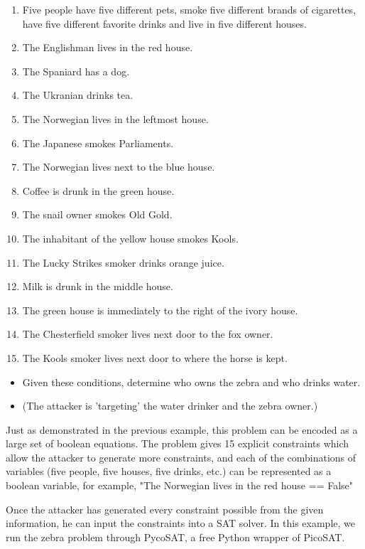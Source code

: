 \documentclass[jou,apacite]{apa6}
\begin{document}
\begin{enumerate}
\item Five people have five different pets, smoke five different
       brands of cigarettes, have five different favorite drinks and
       live in five different houses.
\item The Englishman lives in the red house.
\item The Spaniard has a dog.
\item The Ukranian drinks tea.
\item The Norwegian lives in the leftmost house.
\item The Japanese smokes Parliaments.
\item The Norwegian lives next to the blue house.
\item Coffee is drunk in the green house.
\item The snail owner smokes Old Gold.
\item The inhabitant of the yellow house smokes Kools.
\item The Lucky Strikes smoker drinks orange juice.
\item Milk is drunk in the middle house.
\item The green house is immediately to the right of the ivory house.
\item The Chesterfield smoker lives next door to the fox owner.
\item The Kools smoker lives next door to where the horse is kept.
\end{enumerate}


\begin{itemize}
\item Given these conditions, determine who owns the zebra and who drinks water.
\item (The attacker is 'targeting' the water drinker and the zebra owner.)
\end{itemize}

Just as demonstrated in the previous example, this problem
can be encoded as a large set of boolean equations. The problem
gives 15 explicit constraints which allow the attacker to generate more constraints, and each of the combinations of variables (five people, five houses, five drinks, etc.) can be represented as a boolean variable, for example, "The Norwegian lives in the red house == False"

Once the attacker has generated every constraint possible from the given information, he can input the constraints into a SAT solver. In this example, we run the zebra problem through PycoSAT, a free Python wrapper of PicoSAT.
\end{document}
